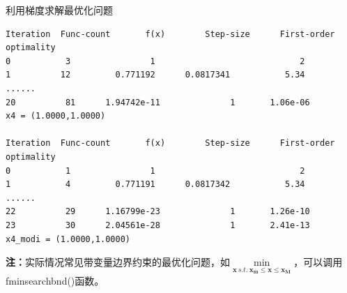 \documentclass[10pt]{beamer}
\begin{document}
\begin{frame}[fragile]{利用梯度求解最优化问题}

\begin{lstlisting}                                            
Iteration  Func-count       f(x)        Step-size      First-order optimality
0           3                1                             2
1          12         0.771192      0.0817341           5.34  
......
20          81      1.94742e-11              1       1.06e-06
x4 = (1.0000,1.0000)
                   
Iteration  Func-count       f(x)        Step-size      First-order optimality
0           1                1                             2
1           4         0.771191      0.0817342           5.34  
......
22          29      1.16799e-23              1       1.26e-10
23          30      2.04561e-28              1       2.41e-13
x4_modi = (1.0000,1.0000)
\end{lstlisting}

\textbf{注：}实际情况常见带变量边界约束的最优化问题，如$\min\limits_{\mathbf{x}\ s.t.\ \mathbf{x_m} \leqslant \mathbf{x} \leqslant \mathbf{x_M}}$，可以调用fminsearchbnd()函数。

\end{frame}

\end{document}
